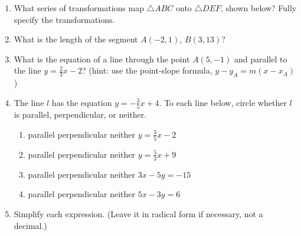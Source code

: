\documentclass[12pt, twoside]{article}
\begin{document}
\begin{enumerate}
\item What series of transformations map $\triangle ABC$ onto $\triangle DEF$, shown below? Fully specify the transformations.
  \begin{center}
  \end{center}
\vspace{2cm}

\newpage

\item What is the length of the segment $A(-2,1)$, $B(3,13)$?
  \vspace{6cm}

\item What is the equation of a line through the point $A(5,-1)$ and parallel to the line $y=\frac{2}{3}x-2$? (hint: use the point-slope formula, $y-y_A=m (x-x_A)$) \vspace{2.5cm}


\item The line $l$ has the equation $y=-\frac{3}{5}x+4$. To each line below, circle whether $l$ is parallel, perpendicular, or neither.
  \begin{enumerate}
    \item parallel \quad perpendicular \quad neither \qquad $y=\frac{3}{5}x-2$
    \vspace{0.5cm}
    \item parallel \quad perpendicular \quad neither \qquad $y=\frac{5}{3}x+9$
    \vspace{0.5cm}
    \item parallel \quad perpendicular \quad neither \qquad $3x-5y=-15$
    \vspace{2cm}
    \item parallel \quad perpendicular \quad neither \qquad $5x-3y=6$
    \vspace{1.7cm}
  \end{enumerate}

\item Simplify each expression. (Leave it in radical form if necessary, not a decimal.)
  \begin{enumerate}
  \end{enumerate}


\end{enumerate}
\end{document}
